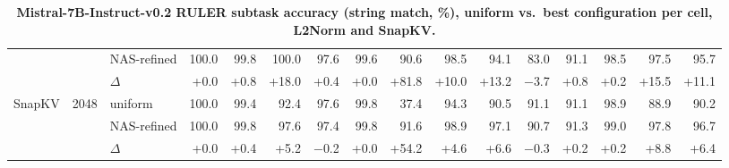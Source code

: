 \begin{table}[tp]
\begin{tabular}{@{}l r l r r r r r r r r r r r r r @{}}
     &  & NAS-refined & 100.0 & 99.8 & 100.0 & 97.6 & 99.6 & 90.6 & 98.5 & 94.1 & 83.0 & 91.1 & 98.5 & 97.5 & 95.7 \\
     &  & $\Delta$ & +0.0 & +0.8 & +18.0 & +0.4 & +0.0 & +81.8 & +10.0 & +13.2 & $-$3.7 & +0.8 & +0.2 & +15.5 & +11.1 \\
    \midrule
    SnapKV & 2048 & uniform & 100.0 & 99.4 & 92.4 & 97.6 & 99.8 & 37.4 & 94.3 & 90.5 & 91.1 & 91.1 & 98.9 & 88.9 & 90.2 \\
     &  & NAS-refined & 100.0 & 99.8 & 97.6 & 97.4 & 99.8 & 91.6 & 98.9 & 97.1 & 90.7 & 91.3 & 99.0 & 97.8 & 96.7 \\
     &  & $\Delta$ & +0.0 & +0.4 & +5.2 & $-$0.2 & +0.0 & +54.2 & +4.6 & +6.6 & $-$0.3 & +0.2 & +0.2 & +8.8 & +6.4 \\
    \bottomrule
  \end{tabular}
  \caption{\textbf{Mistral-7B-Instruct-v0.2 RULER subtask accuracy (string match, \%), uniform vs.\ best configuration per cell, L2Norm and SnapKV.}}
  \label{tab:app-ruler-mistral}
\end{table}

